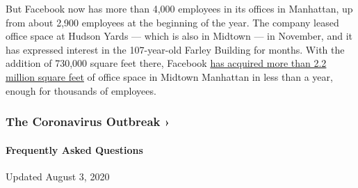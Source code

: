 But Facebook now has more than 4,000 employees in its offices in
Manhattan, up from about 2,900 employees at the beginning of the year.
The company leased office space at Hudson Yards --- which is also in
Midtown --- in November, and it has expressed interest in the
107-year-old Farley Building for months. With the addition of 730,000
square feet there, Facebook
\href{https://www.nytimes3xbfgragh.onion/2020/01/05/nyregion/nyc-tech-facebook-amazon-google.html}{has
acquired more than 2.2 million square feet} of office space in Midtown
Manhattan in less than a year, enough for thousands of employees.

\href{https://www.nytimes3xbfgragh.onion/news-event/coronavirus?action=click\&pgtype=Article\&state=default\&region=MAIN_CONTENT_3\&context=storylines_faq}{}

\hypertarget{the-coronavirus-outbreak-}{%
\subsubsection{The Coronavirus Outbreak
›}\label{the-coronavirus-outbreak-}}

\hypertarget{frequently-asked-questions}{%
\paragraph{Frequently Asked
Questions}\label{frequently-asked-questions}}

Updated August 3, 2020

